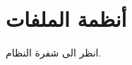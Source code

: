\documentclass[document.tex]{subfiles}
\begin{document}
\chapter{أنظمة الملفات}
انظر الى شفرة النظام.
\end{document}
